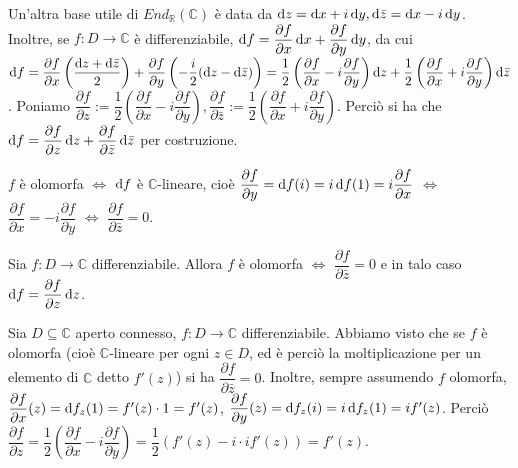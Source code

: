 Un'altra base utile di $End_{\mathbb{R}}(\mathbb{C})$ è data da $\mathop{}\!\mathrm{d} z= \mathop{}\!\mathrm{d} x+i\mathop{}\!\mathrm{d} y, \mathop{}\!\mathrm{d} \bar{z}=\mathop{}\!\mathrm{d} x-i\mathop{}\!\mathrm{d} y$. Inoltre, se $f:D \longrightarrow \mathbb{C}$ è differenziabile, $\mathop{}\!\mathrm{d} f=\dfrac{\partial f}{\partial x}\mathop{}\!\mathrm{d} x+\dfrac{\partial f}{\partial y}\mathop{}\!\mathrm{d} y$,
da cui $\mathop{}\!\mathrm{d} f=\dfrac{\partial f}{\partial x}\left(\dfrac{\mathop{}\!\mathrm{d} z+\mathop{}\!\mathrm{d} \bar{z}}{2}\right)+\dfrac{\partial f}{\partial y}\left(-\dfrac{i}{2}(\mathop{}\!\mathrm{d} z-\mathop{}\!\mathrm{d} \bar{z})\right)=\dfrac{1}{2}\left(\dfrac{\partial f}{\partial x}-i\dfrac{\partial f}{\partial y}\right)\mathop{}\!\mathrm{d} z+\dfrac{1}{2}\left(\dfrac{\partial f}{\partial x}+i\dfrac{\partial f}{\partial y}\right)\mathop{}\!\mathrm{d} \bar{z}$.
Poniamo $\dfrac{\partial f}{\partial z}:=\dfrac{1}{2}\left(\dfrac{\partial f}{\partial x}-i\dfrac{\partial f}{\partial y}\right), \dfrac{\partial f}{\partial \bar{z}}:=\dfrac{1}{2}\left(\dfrac{\partial f}{\partial x}+i\dfrac{\partial f}{\partial y}\right)$.
Perciò si ha che $\mathop{}\!\mathrm{d} f=\dfrac{\partial f}{\partial z}\mathop{}\!\mathrm{d} z+\dfrac{\partial f}{\partial \bar{z}}\mathop{}\!\mathrm{d} \bar{z}$ per costruzione.

\begin{oss}
  $f$ è olomorfa $\iff$ $\mathop{}\!\mathrm{d} f$ è $\mathbb{C}$-lineare, cioè $\dfrac{\partial f}{\partial y}=\mathop{}\!\mathrm{d} f(i)=i\mathop{}\!\mathrm{d} f(1)=i\dfrac{\partial f}{\partial x}$ $\iff$ $\dfrac{\partial f}{\partial x}=-i\dfrac{\partial f}{\partial y}$ $\iff$ $\dfrac{\partial f}{\partial \bar{z}}=0$.
\end{oss}

\begin{prop}
  Sia $f:D \longrightarrow \mathbb{C}$ differenziabile. Allora $f$ è olomorfa $\iff$ $\dfrac{\partial f}{\partial \bar{z}}=0$ e in talo caso $\mathop{}\!\mathrm{d} f=\dfrac{\partial f}{\partial z}\mathop{}\!\mathrm{d} z$.
\end{prop}

\begin{oss}
  Sia $D \subseteq \mathbb{C}$ aperto connesso, $f:D \longrightarrow \mathbb{C}$ differenziabile. Abbiamo visto che se $f$ è olomorfa (cioè $\mathbb{C}$-lineare per ogni $z \in D$, ed è perciò la moltiplicazione per un elemento di $\mathbb{C}$ detto $f'(z)$) si ha $\dfrac{\partial f}{\partial \bar{z}}=0$.
  Inoltre, sempre assumendo $f$ olomorfa, $\dfrac{\partial f}{\partial x}(z)=\mathop{}\!\mathrm{d} f_z(1)=f'(z)\cdot 1=f'(z)$, $\dfrac{\partial f}{\partial y}(z)=\mathop{}\!\mathrm{d} f_z(i)=i\mathop{}\!\mathrm{d} f_z(1)=if'(z)$.
  Perciò $\dfrac{\partial f}{\partial z}=\dfrac{1}{2}\left(\dfrac{\partial f}{\partial x}-i\dfrac{\partial f}{\partial y}\right)=\dfrac{1}{2}(f'(z)-i \cdot if'(z))=f'(z)$.
\end{oss}

